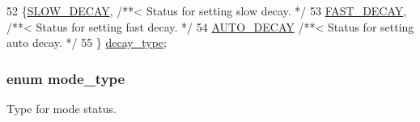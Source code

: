 \begin{DoxyCode}
52              \{\hyperlink{group__biba__drv_ggafe05744bd777532cf059c0d7293a7ab8a05f6a902065ce2f3355101cf657f4ba4}{SLOW\_DECAY},       \textcolor{comment}{/**< Status for setting slow decay. */}
53         \hyperlink{group__biba__drv_ggafe05744bd777532cf059c0d7293a7ab8af9716e06b54f75cbd7dedc154a7d49e2}{FAST\_DECAY},             \textcolor{comment}{/**< Status for setting fast decay. */}
54         \hyperlink{group__biba__drv_ggafe05744bd777532cf059c0d7293a7ab8abbe5a117b6da07d1a52741cfff2e927a}{AUTO\_DECAY}              \textcolor{comment}{/**< Status for setting auto decay. */}
55         \} \hyperlink{group__biba__drv_gafe05744bd777532cf059c0d7293a7ab8}{decay\_type};
\end{DoxyCode}
\hypertarget{group__biba__drv_ga19269c193c0c4866cdc4e5abd433f9fc}{
\subsubsection[{mode\-\_\-type}]{\setlength{\rightskip}{0pt plus 5cm}enum {\bf mode\-\_\-type}}}\label{group__biba__drv_ga19269c193c0c4866cdc4e5abd433f9fc}


Type for mode status. 

